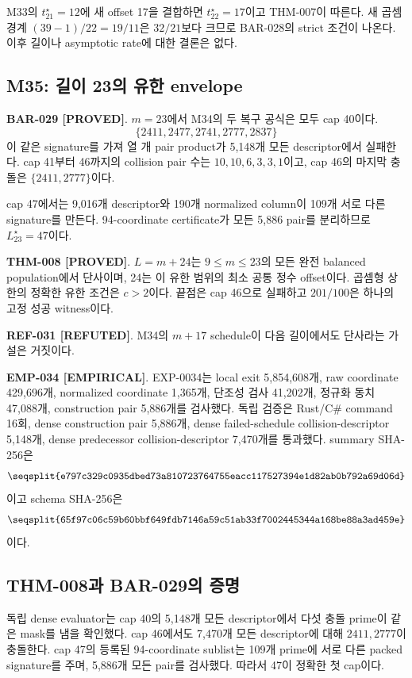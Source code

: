 \documentclass[11pt]{article}
\newcommand{\claimstatus}[2]{\textbf{#1 [#2]}}
\begin{document}
M33의 \(t_{21}^\star=12\)에 새 offset 17을 결합하면
\(t_{22}^\star=17\)이고 THM-007이 따른다. 새 곱셈 경계
\((39-1)/22=19/11\)은 \(32/21\)보다 크므로 BAR-028의 strict 조건이
나온다. 이후 길이나 asymptotic rate에 대한 결론은 없다.

\subsection{M35: 길이 23의 유한 envelope}

\claimstatus{BAR-029}{PROVED}.
\(m=23\)에서 M34의 두 복구 공식은 모두 cap 40이다.
\[
\{2411,2477,2741,2777,2837\}
\]
이 같은 signature를 가져 열 개
pair product가 5,148개 모든 descriptor에서 실패한다. cap 41부터
46까지의 collision pair 수는 \(10,10,6,3,3,1\)이고, cap 46의
마지막 충돌은 \(\{2411,2777\}\)이다.

cap 47에서는 9,016개 descriptor와 190개 normalized column이 109개
서로 다른 signature를 만든다. 94-coordinate certificate가 모든
5,886 pair를 분리하므로 \(L_{23}^\star=47\)이다.

\claimstatus{THM-008}{PROVED}.
\(L=m+24\)는 \(9\le m\le23\)의 모든 완전 balanced population에서
단사이며, 24는 이 유한 범위의 최소 공통 정수 offset이다. 곱셈형
상한의 정확한 유한 조건은 \(c>2\)이다. 끝점은 cap 46으로 실패하고
\(201/100\)은 하나의 고정 성공 witness이다.

\claimstatus{REF-031}{REFUTED}.
M34의 \(m+17\) schedule이 다음 길이에서도 단사라는 가설은 거짓이다.

\claimstatus{EMP-034}{EMPIRICAL}.
EXP-0034는 local exit 5,854,608개, raw coordinate 429,696개,
normalized coordinate 1,365개, 단조성 검사 41,202개, 정규화 동치
47,088개, construction pair 5,886개를 검사했다. 독립 검증은
Rust/C\# command 16회, dense construction pair 5,886개, dense
failed-schedule collision-descriptor 5,148개, dense predecessor
collision-descriptor 7,470개를 통과했다. summary SHA-256은
\[
\texttt{\seqsplit{e797c329c0935dbed73a810723764755eacc117527394e1d82ab0b792a69d06d}}
\]
이고 schema SHA-256은
\[
\texttt{\seqsplit{65f97c06c59b60bbf649fdb7146a59c51ab33f7002445344a168be88a3ad459e}}
\]
이다.

\subsection{THM-008과 BAR-029의 증명}

독립 dense evaluator는 cap 40의 5,148개 모든 descriptor에서 다섯
충돌 prime이 같은 mask를 냄을 확인했다. cap 46에서도 7,470개 모든
descriptor에 대해 \(2411,2777\)이 충돌한다. cap 47의 등록된
94-coordinate sublist는 109개 prime에 서로 다른 packed signature를
주며, 5,886개 모든 pair를 검사했다. 따라서 47이 정확한 첫 cap이다.
\end{document}
